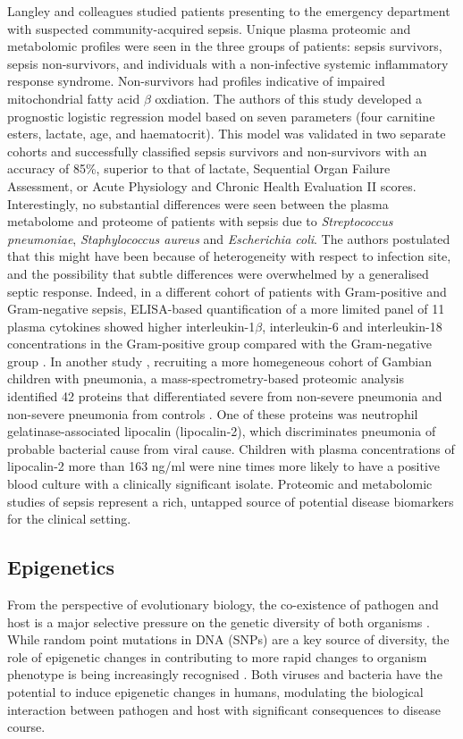 Langley and colleagues \parencite{Langley2013} studied patients presenting to the emergency department with suspected community-acquired sepsis. Unique plasma proteomic and metabolomic profiles were seen in the three groups of patients: sepsis survivors, sepsis non-survivors, and individuals with a non-infective systemic inflammatory response syndrome. Non-survivors had profiles indicative of impaired mitochondrial fatty acid $\beta$ oxdiation. The authors of this study developed a prognostic logistic regression model based on seven parameters (four carnitine esters, lactate, age, and haematocrit). This model was validated in two separate cohorts and successfully classified sepsis survivors and non-survivors with an accuracy of 85\%, superior to that of lactate, Sequential Organ Failure Assessment, or Acute Physiology and Chronic Health Evaluation II scores. Interestingly, no substantial differences were seen between the plasma metabolome and proteome of patients with sepsis due to \textit{Streptococcus pneumoniae}, \textit{Staphylococcus aureus} and \textit{Escherichia coli}. The authors postulated that this might have been because of heterogeneity with respect to infection site, and the possibility that subtle differences were overwhelmed by a generalised septic response. Indeed, in a different cohort of patients with Gram-positive and Gram-negative sepsis, ELISA-based quantification of a more limited panel of 11 plasma cytokines showed higher interleukin-1$\beta$, interleukin-6 and interleukin-18 concentrations in the Gram-positive group compared with the Gram-negative group \parencite{Feezor2003}. In another study \parencite{Huang2014}, recruiting a more homegeneous cohort of Gambian children with pneumonia, a mass-spectrometry-based proteomic analysis identified 42 proteins that differentiated severe from non-severe pneumonia and non-severe pneumonia from controls \parencite{Huang2014}. One of these proteins was neutrophil gelatinase-associated lipocalin (lipocalin-2), which discriminates pneumonia of probable bacterial cause from viral cause. Children with plasma concentrations of lipocalin-2 more than 163 ng/ml were nine times more likely to have a positive blood culture with a clinically significant isolate. Proteomic and metabolomic studies of sepsis represent a rich, untapped source of potential disease biomarkers for the clinical setting. 

\subsection{Epigenetics}
From the perspective of evolutionary biology, the co-existence of pathogen and host is a major selective pressure on the genetic diversity of both organisms \parencite{Sironi2015}. While random point mutations in DNA (SNPs) are a key source of diversity, the role of epigenetic changes in contributing to more rapid changes to organism phenotype is being increasingly recognised \parencite{Rando2007}. Both viruses \parencite{Paschos2010} and bacteria \parencite{Hamon2008} have the potential to induce epigenetic changes in humans, modulating the biological interaction between pathogen and host with significant consequences to disease course.

